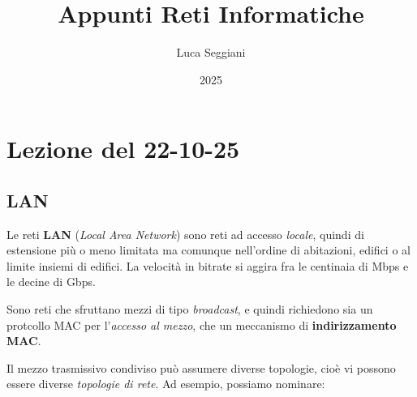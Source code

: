 \documentclass[a4paper,11pt]{article}
\title{Appunti Reti Informatiche}
\author{Luca Seggiani}
\date{2025}
\begin{document}
\section{Lezione del 22-10-25}

\thispagestyle{empty}
\pagestyle{fancy}

\subsection{LAN}
Le reti \textbf{LAN} (\textit{Local Area Network}) sono reti ad accesso \textit{locale}, quindi di estensione più o meno limitata ma comunque nell'ordine di abitazioni, edifici o al limite insiemi di edifici. La velocità in bitrate si aggira fra le centinaia di Mbps e le decine di Gbps.

Sono reti che sfruttano mezzi di tipo \textit{broadcast}, e quindi richiedono sia un protcollo MAC per l'\textit{accesso al mezzo}, che un meccanismo di \textbf{indirizzamento MAC}.

Il mezzo trasmissivo condiviso può assumere diverse topologie, cioè vi possono essere diverse \textit{topologie di rete}.
Ad esempio, possiamo nominare: 

\newpage
\end{document}
